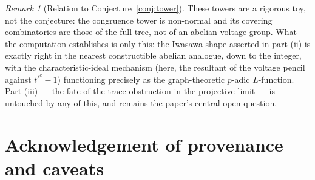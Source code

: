 \documentclass[11pt]{amsart}
\numberwithin{equation}{section}
\theoremstyle{definition}
\theoremstyle{remark}
\newtheorem{remark}[theorem]{Remark}
\begin{document}
\begin{remark}[Relation to Conjecture~\ref{conj:tower}]
These towers are a rigorous toy, not the conjecture: the congruence tower is non-normal
and its covering combinatorics are those of the full tree, not of an abelian voltage
group. What the computation establishes is only this: the Iwasawa shape asserted in
part (ii) is exactly right in the nearest constructible abelian analogue, down to the
integer, with the characteristic-ideal mechanism (here, the resultant of the voltage
pencil against $t^{\ell^k}-1$) functioning precisely as the graph-theoretic
$p$-adic $L$-function. Part (iii) --- the fate of the trace obstruction in the projective
limit --- is untouched by any of this, and remains the paper's central open question.
\end{remark}

\section*{Acknowledgement of provenance and caveats}
\end{document}
